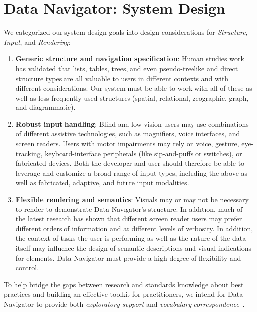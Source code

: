 \documentclass[12pt]{cmuthesis}
\begin{document}
\section{Data Navigator: System Design}

We categorized our system design goals into design considerations for \textit{Structure}, \textit{Input}, and \textit{Rendering}:
\begin{enumerate}
  \itemsep-0.4em
  \item \textbf{Generic structure and navigation specification}: Human studies work has validated that lists, tables, trees, and even pseudo-treelike and direct structure types are all valuable to users in different contexts and with different considerations. Our system must be able to work with all of these as well as less frequently-used structures (spatial, relational, geographic, graph, and diagrammatic).
  \item \textbf{Robust input handling}: Blind and low vision users may use combinations of different assistive technologies, such as magnifiers, voice interfaces, and screen readers. Users with motor impairments may rely on voice, gesture, eye-tracking, keyboard-interface peripherals (like sip-and-puffs or switches), or fabricated devices. Both the developer and user should therefore be able to leverage and customize a broad range of input types, including the above as well as fabricated, adaptive, and future input modalities.
  \item \textbf{Flexible rendering and semantics}: Visuals may or may not be necessary to render to demonstrate Data Navigator's structure. In addition, much of the latest research has shown that different screen reader users may prefer different orders of information and at different levels of verbosity. In addition, the context of tasks the user is performing as well as the nature of the data itself may influence the design of semantic descriptions and visual indications for elements. Data Navigator must provide a high degree of flexibility and control.
\end{enumerate}

To help bridge the gaps between research and standards knowledge about best practices and building an effective toolkit for practitioners, we intend for Data Navigator to provide both \textit{exploratory support} and \textit{vocabulary correspondence}~\cite{Maayan2020Domain}.
\end{document}
